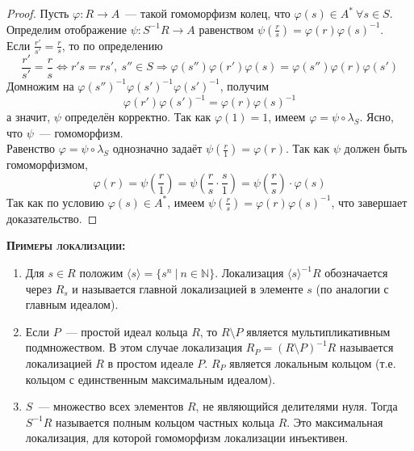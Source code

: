 \documentclass[11pt]{article}
\begin{document}
\begin{proof}
        Пусть $\varphi\colon R \to A$~--- такой гомоморфизм колец, что $\varphi(s) \in A^* \ \forall s \in S$.
        Определим отображение $\psi\colon S^{-1}R \to A$ равенством $\psi(\frac{r}{s}) = \varphi(r) \varphi(s)^{-1}$. \\

        Если $\frac{r'}{s'} = \frac{r}{s}$, то по определению
        \[ \frac{r'}{s'} = \frac{r}{s} \Leftrightarrow r' s = r s', \ s'' \in S \Rightarrow \varphi(s'')\varphi(r')\varphi(s) = \varphi(s'') \varphi(r) \varphi(s') \]
        Домножим на $\varphi(s'')^{-1} \varphi(s')^{-1} \varphi(s')^{-1}$, получим
        \[ \varphi(r') \varphi(s')^{-1} = \varphi(r) \varphi(s)^{-1} \]
        а значит, $\psi$ определён корректно. Так как $\varphi(1) = 1$, имеем $\varphi = \psi \circ \lambda_{S}$. Ясно, что $\psi$~--- гомоморфизм. \\

        Равенство $\varphi = \psi \circ \lambda_{S}$ однозначно задаёт $\psi(\frac{r}{1}) = \varphi(r)$. Так как $\psi$ должен
        быть гомоморфизмом,
        \[ \varphi(r) = \psi(\frac{r}{1}) = \psi(\frac{r}{s} \cdot \frac{s}{1}) = \psi(\frac{r}{s}) \cdot \varphi(s) \]
        Так как по условию $\varphi(s) \in A^*$, имеем $\psi(\frac{r}{s}) = \varphi(r)\varphi(s)^{-1}$, что завершает доказательство.


    \end{proof}

    \textsc{\textbf{Примеры локализации:}}
    \begin{enumerate}
        \item Для $s \in R$ положим $\langle s \rangle = \{ s^n \ | \ n \in \mathbb{N} \}$. Локализация $\langle s \rangle^{-1}R$
              обозначается через $R_s$ и называется главной локализацией в элементе $s$ (по аналогии с главным идеалом).
        \item Если $P$~--- простой идеал кольца $R$, то $R \setminus P$ является мультипликативным подмножеством.
              В этом случае локализация $R_{P} = (R \setminus P)^{-1} R$ называется локализацией $R$ в простом идеале $P$.
              $R_P$ является локальным кольцом (т.е. кольцом с единственным максимальным идеалом).
        \item $S$~--- множество всех элементов $R$, не являющийся делителями нуля. Тогда $S^{-1}R$ называется полным кольцом частных
              кольца $R$. Это максимальная локализация, для которой гомоморфизм локализации инъективен.
    \end{enumerate}
\end{document}
